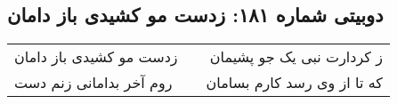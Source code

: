 \begin{center}
\section*{دوبیتی شماره ۱۸۱: زدست مو کشیدی باز دامان}
\label{sec:181}
\begin{longtable}{l p{0.5cm} r}
زدست مو کشیدی باز دامان
&&
ز کردارت نبی یک جو پشیمان
\\
روم آخر بدامانی زنم دست
&&
که تا از وی رسد کارم بسامان
\\
\end{longtable}
\end{center}
